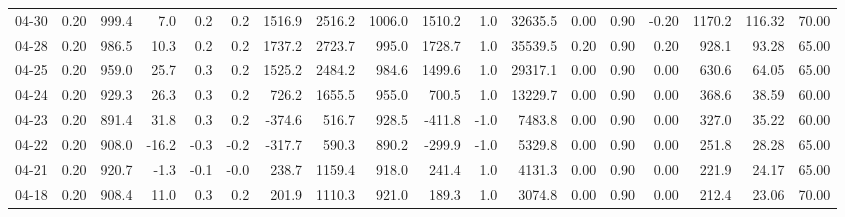 \begin{threeparttable}
{\begin{tabular}{lrrrrrrrrrrrrrrrrr}
  04-30 &     0.20 &  999.4 &               7.0 &               0.2 &                0.2 &             1516.9 & 2516.2 & 1006.0 &     1510.2 &                      1.0 &             32635.5 &       0.00 &      0.90 &          -0.20 &           1170.2 &          116.32 &                  70.00 \\
  04-28 &     0.20 &  986.5 &              10.3 &               0.2 &                0.2 &             1737.2 & 2723.7 &  995.0 &     1728.7 &                      1.0 &             35539.5 &       0.20 &      0.90 &           0.20 &            928.1 &           93.28 &                  65.00 \\
  04-25 &     0.20 &  959.0 &              25.7 &               0.3 &                0.2 &             1525.2 & 2484.2 &  984.6 &     1499.6 &                      1.0 &             29317.1 &       0.00 &      0.90 &           0.00 &            630.6 &           64.05 &                  65.00 \\
  04-24 &     0.20 &  929.3 &              26.3 &               0.3 &                0.2 &              726.2 & 1655.5 &  955.0 &      700.5 &                      1.0 &             13229.7 &       0.00 &      0.90 &           0.00 &            368.6 &           38.59 &                  60.00 \\
  04-23 &     0.20 &  891.4 &              31.8 &               0.3 &                0.2 &             -374.6 &  516.7 &  928.5 &     -411.8 &                     -1.0 &              7483.8 &       0.00 &      0.90 &           0.00 &            327.0 &           35.22 &                  60.00 \\
  04-22 &     0.20 &  908.0 &             -16.2 &              -0.3 &               -0.2 &             -317.7 &  590.3 &  890.2 &     -299.9 &                     -1.0 &              5329.8 &       0.00 &      0.90 &           0.00 &            251.8 &           28.28 &                  65.00 \\
  04-21 &     0.20 &  920.7 &              -1.3 &              -0.1 &               -0.0 &              238.7 & 1159.4 &  918.0 &      241.4 &                      1.0 &              4131.3 &       0.00 &      0.90 &           0.00 &            221.9 &           24.17 &                  65.00 \\
  04-18 &     0.20 &  908.4 &              11.0 &               0.3 &                0.2 &              201.9 & 1110.3 &  921.0 &      189.3 &                      1.0 &              3074.8 &       0.00 &      0.90 &           0.00 &            212.4 &           23.06 &                  70.00 \\

\end{tabular}}
\end{threeparttable}
